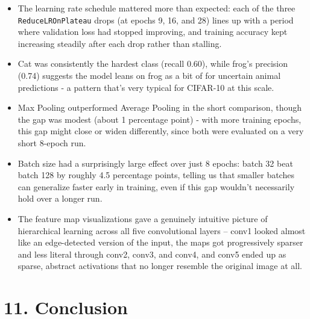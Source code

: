 \documentclass[11pt]{article}
\begin{document}
\begin{itemize}[leftmargin=*]
\item The learning rate schedule mattered more than expected: each of the three \texttt{ReduceLROnPlateau} drops (at epochs 9, 16, and 28) lines up with a period where validation loss had stopped improving, and training accuracy kept increasing steadily after each drop rather than stalling.
\item Cat was consistently the hardest class (recall 0.60), while frog's precision (0.74) suggests the model leans on frog as a bit of for uncertain animal predictions - a pattern that's very typical for CIFAR-10 at this scale.
\item Max Pooling outperformed Average Pooling in the short comparison, though the gap was modest (about 1 percentage point) - with more training epochs, this gap might close or widen differently, since both were evaluated on a very short 8-epoch run.
\item Batch size had a surprisingly large effect over just 8 epochs: batch 32 beat batch 128 by roughly 4.5 percentage points, telling us that smaller batches can generalize faster early in training, even if this gap wouldn't necessarily hold over a longer run.
\item The feature map visualizations gave a genuinely intuitive picture of hierarchical learning across all five convolutional layers -- conv1 looked almost like an edge-detected version of the input, the maps got progressively sparser and less literal through conv2, conv3, and conv4, and conv5 ended up as sparse, abstract activations that no longer resemble the original image at all.
\end{itemize}


\section*{11. Conclusion}
\end{document}
